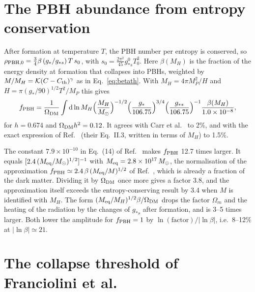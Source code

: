\documentclass{article}
\newcommand{\dd}{\mathrm{d}}
\newcommand{\fpbh}{f_{\rm PBH}}
\newcommand{\Mo}{M_\odot}
\begin{document}
\section{The PBH abundance from entropy conservation}\label{app:fpbh}

After formation at temperature $T$, the PBH number per entropy is conserved, so
$\rho_{\rm PBH,0}=\frac34\beta\,(g_*/g_{*s})\,T\,s_0$, with $s_0=\frac{2\pi^2}{45}g_{*s}^0T_0^3$.
Here $\beta(M_H)$ is the fraction of the energy density at formation that collapses into PBHs,
weighted by $M/M_H=\mathcal K(C-C_{\rm th})^\gamma$ as in Eq.~\eqref{eq:betath}. With
$M_H=4\pi M_P^2/H$ and $H=\pi(g_*/90)^{1/2}T^2/M_P$ this gives
\begin{equation}
\fpbh=\frac{1}{\Omega_{\rm DM}}\int\dd\ln M_H\Big(\frac{M_H}{\Mo}\Big)^{-1/2}
\Big(\frac{g_*}{106.75}\Big)^{3/4}\Big(\frac{g_{*s}}{106.75}\Big)^{-1}\frac{\beta(M_H)}{1.0\times10^{-8}},
\end{equation}
for $h=0.674$ and $\Omega_{\rm DM}h^2=0.12$. It agrees with Carr et al.~\cite{Carr10} to 2\%, and
with the exact expression of Ref.~\cite{CK20} (their Eq.~II.3, written in terms of $M_H$) to
1.5\%.

The constant $7.9\times10^{-10}$ in Eq.~(14) of Ref.~\cite{FIVT23} makes $\fpbh$ 12.7 times
larger. It equals $[2.4\,(M_{\rm eq}/\Mo)^{1/2}]^{-1}$ with $M_{\rm eq}=2.8\times10^{17}\,\Mo$, the
normalisation of the approximation $\fpbh\simeq2.4\,\beta\,(M_{\rm eq}/M)^{1/2}$ of
Ref.~\cite{CK20}, which is already a fraction of the dark matter. Dividing it by $\Omega_{\rm DM}$
once more gives a factor 3.8, and the approximation itself exceeds the entropy-conserving result by
3.4 when $M$ is identified with $M_H$. The form $(M_{\rm eq}/M_H)^{1/2}\beta/\Omega_{\rm DM}$ drops
the factor $\Omega_m$ and the heating of the radiation by the changes of $g_{*s}$ after formation,
and is 3--5 times larger. Both lower the amplitude for $\fpbh=1$ by $\ln(\text{factor})/|\ln\beta|$,
i.e.\ 8--12\% at $|\ln\beta|\simeq21$.

\section{The collapse threshold of Franciolini et al.}\label{app:th}
\end{document}
